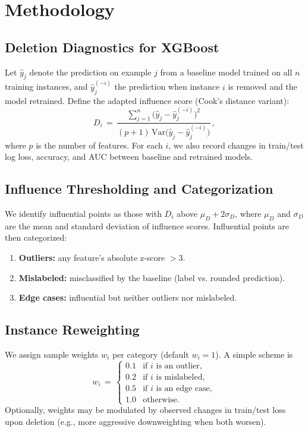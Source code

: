 \documentclass[sn-basic]{sn-jnl} %
\begin{document}
\section{Methodology}
\subsection{Deletion Diagnostics for XGBoost}
Let $\hat{y}_j$ denote the prediction on example $j$ from a baseline model trained on all $n$ training instances, and $\hat{y}_j^{(-i)}$ the prediction when instance $i$ is removed and the model retrained. Define the adapted influence score (Cook’s distance variant):
\begin{equation}
D_i \,=\, \frac{\sum_{j=1}^{n} \big(\hat{y}_j - \hat{y}_j^{(-i)}\big)^2}{(p+1)\,\mathrm{Var}\big(\hat{y}_j - \hat{y}_j^{(-i)}\big)}\,,
\label{eq:cooks}
\end{equation}
where $p$ is the number of features. For each $i$, we also record changes in train/test log loss, accuracy, and AUC between baseline and retrained models.

\subsection{Influence Thresholding and Categorization}
We identify influential points as those with $D_i$ above $\mu_D + 2\sigma_D$, where $\mu_D$ and $\sigma_D$ are the mean and standard deviation of influence scores. Influential points are then categorized:
\begin{enumerate}[leftmargin=*]
  \item \textbf{Outliers:} any feature’s absolute z-score $>3$.
  \item \textbf{Mislabeled:} misclassified by the baseline (label vs. rounded prediction).
  \item \textbf{Edge cases:} influential but neither outliers nor mislabeled.
\end{enumerate}

\subsection{Instance Reweighting}
We assign sample weights $w_i$ per category (default $w_i=1$). A simple scheme is
\begin{equation}
 w_i \,=\, \begin{cases}
 0.1 & \text{if } i \text{ is an outlier},\\
 0.2 & \text{if } i \text{ is mislabeled},\\
 0.5 & \text{if } i \text{ is an edge case},\\
 1.0 & \text{otherwise.}
 \end{cases}
\end{equation}
Optionally, weights may be modulated by observed changes in train/test loss upon deletion (e.g., more aggressive downweighting when both worsen).
\end{document}
